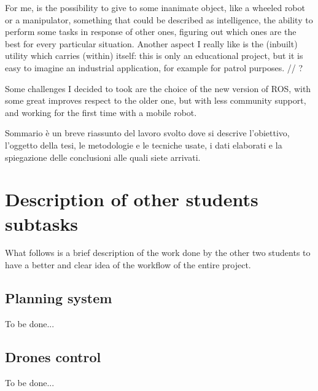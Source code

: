 For me, is the possibility to give to some inanimate object, like a wheeled robot or a manipulator, something that could be described as intelligence, the ability to perform some tasks in response of other ones, figuring out which ones are the best for every particular situation. Another aspect I really like is the (inbuilt) utility which carries (within) itself: this is only an educational project, but it is easy to imagine an industrial application, for example for patrol purposes. // ?

Some challenges I decided to took are the choice of the new version of ROS, with some great improves respect to the older one, but with less community support, and working for the first time with a mobile robot.

Sommario è un breve riassunto del lavoro svolto dove si descrive l'obiettivo, l'oggetto della tesi, le 
metodologie e le tecniche usate, i dati elaborati e la spiegazione delle conclusioni alle quali siete arrivati.  



\section*{Description of other students subtasks}

What follows is a brief description of the work done by the other two students to have a better and clear idea of the workflow of the entire project.

\subsection*{Planning system}

To be done...

\subsection*{Drones control}

To be done...
